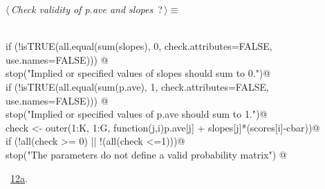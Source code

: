 \documentclass[reqno]{amsart}
\renewcommand{\NWtarget}[2]{\hypertarget{#1}{#2}}
\renewcommand{\NWlink}[2]{\hyperlink{#1}{#2}}
\begin{document}
\begin{flushleft} \small\label{scrap21}\raggedright\small
\NWtarget{nuweb?}{} $\langle\,${\itshape Check validity of p.ave and slopes}\nobreak\ {\footnotesize {?}}$\,\rangle\equiv$
\vspace{-1ex}
\begin{list}{}{} \item
\mbox{}\verb@@\\
\mbox{}\verb@  if (!isTRUE(all.equal(sum(slopes), 0, check.attributes=FALSE, use.names=FALSE))) @\\
\mbox{}\verb@      stop("Implied or specified values of slopes should sum to 0.")@\\
\mbox{}\verb@  if (!isTRUE(all.equal(sum(p.ave), 1, check.attributes=FALSE, use.names=FALSE))) @\\
\mbox{}\verb@      stop("Implied or specified values of p.ave should sum to 1.")@\\
\mbox{}\verb@  check <- outer(1:K, 1:G, function(j,i)p.ave[j] + slopes[j]*(scores[i]-cbar))@\\
\mbox{}\verb@  if (!all(check >= 0) || !(all(check <=1)))@\\
\mbox{}\verb@    stop("The parameters do not define a valid probability matrix")  @\\
\mbox{}\verb@@{\NWsep}
\end{list}
\vspace{-1.5ex}
\footnotesize
\begin{list}{}{\setlength{\itemsep}{-\parsep}\setlength{\itemindent}{-\leftmargin}}
\item \NWtxtMacroRefIn\ \NWlink{nuweb12a}{12a}.

\item{}
\end{list}
\vspace{4ex}
\end{flushleft}
\end{document}
